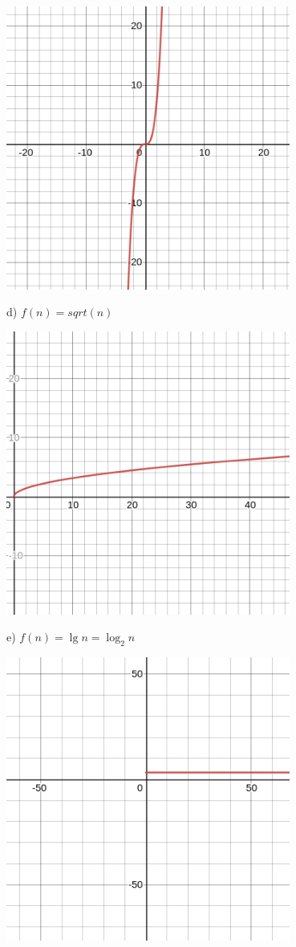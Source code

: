 \documentclass[12pt]{article}
\begin{document}
  \begin{center}
    \includegraphics[width=0.7\textwidth]{graphics/c.png}\\
  \end{center}
  d) $f(n) = sqrt(n)$
  \begin{center}
    \includegraphics[width=0.7\textwidth]{graphics/d.png}\\
  \end{center}
  e) $f(n) = \lg{n} = \log_{2}{n}$
  \begin{center}
    \includegraphics[width=0.7\textwidth]{graphics/e.png}\\
  \end{center}
\end{document}
